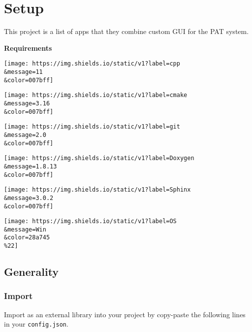 \hypertarget{setup}{%
\section{Setup}\label{setup}}

This project is a list of apps that they combine custom GUI for the PAT
system.

\textbf{Requirements}

\texttt{[image: https://img.shields.io/static/v1?label=cpp\\\&message=11\\\&color=007bff]}

\texttt{[image: https://img.shields.io/static/v1?label=cmake\\\&message=3.16\\\&color=007bff]}

\texttt{[image: https://img.shields.io/static/v1?label=git\\\&message=2.0\\\&color=007bff]}

\texttt{[image: https://img.shields.io/static/v1?label=Doxygen\\\&message=1.8.13\\\&color=007bff]}

\texttt{[image: https://img.shields.io/static/v1?label=Sphinx\\\&message=3.0.2\\\&color=007bff]}

\texttt{[image: https://img.shields.io/static/v1?label=OS\\\&message=Win\\\&color=28a745\\\%22]}

\hypertarget{generality}{%
\subsection{Generality}\label{generality}}

\hypertarget{import}{%
\subsubsection{Import}\label{import}}

Import as an external library into your project by copy-paste the
following lines in your \texttt{config.json}.

\begin{Shaded}
\begin{Highlighting}[]
\FunctionTok{\{}
       \FunctionTok{:} \FunctionTok{,}
       \FunctionTok{:} \FunctionTok{,}
        \FunctionTok{:} \FunctionTok{,}
  \FunctionTok{:} \FunctionTok{,}
     \FunctionTok{:} 
\FunctionTok{\}}
\end{Highlighting}
\end{Shaded}

